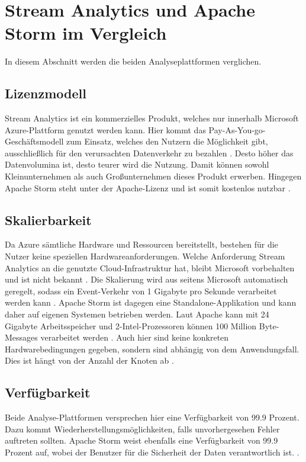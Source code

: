 \section{Stream Analytics und Apache Storm im Vergleich}
In diesem Abschnitt werden die beiden Analyseplattformen verglichen. 


\subsection{Lizenzmodell}
Stream Analytics ist ein kommerzielles Produkt, welches nur innerhalb Microsoft Azure-Plattform genutzt werden kann. Hier kommt das Pay-As-You-go-Geschäftsmodell zum Einsatz, welches den Nutzern die Möglichkeit gibt, ausschließlich für den verursachten Datenverkehr zu bezahlen \cite{Pricing.2017}.  Desto höher das Datenvolumina ist, desto teurer wird die Nutzung. Damit können sowohl Kleinunternehmen als auch Großunternehmen dieses Produkt erwerben. Hingegen Apache Storm steht unter der Apache-Lizenz und ist somit kostenlos nutzbar \cite{lizenz.2004}. 

\subsection{Skalierbarkeit}
Da Azure sämtliche Hardware und Ressourcen bereitstellt, bestehen für die Nutzer keine speziellen Hardwareanforderungen. Welche Anforderung Stream Analytics an die genutzte Cloud-Infrastruktur hat, bleibt Microsoft vorbehalten und ist nicht bekannt \cite{samacha.2017}. Die Skalierung wird aus seitens Microsoft automatisch geregelt, sodass ein Event-Verkehr von 1 Gigabyte pro Sekunde verarbeitet werden kann \cite{samacha.19.12.2017b}. Apache Storm ist dagegen eine Standalone-Applikation und kann daher auf eigenen Systemen betrieben werden. Laut Apache kann mit 24 Gigabyte Arbeitsspeicher und 2-Intel-Prozessoren können 100 Million Byte-Messages verarbeitet werden \cite{apachescale.2017}. Auch hier sind keine konkreten Hardwarebedingungen gegeben, sondern sind abhängig von dem Anwendungsfall. Dies ist hängt von der Anzahl der Knoten ab \cite{samacha.2017}.


\subsection{Verfügbarkeit}
Beide Analyse-Plattformen versprechen hier eine Verfügbarkeit von 99.9 Prozent. Dazu kommt Wiederherstellungsmöglichkeiten, falls unvorhergesehen Fehler auftreten sollten. Apache Storm weist ebenfalls eine Verfügbarkeit von 99.9 Prozent auf, wobei der Benutzer für die Sicherheit der Daten verantwortlich ist. \cite{samacha.2017}. 


